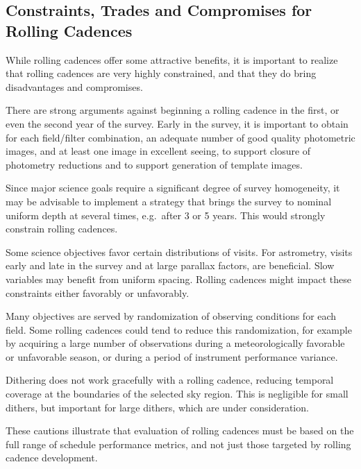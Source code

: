 
\subsection{Constraints, Trades and Compromises for Rolling Cadences}
\label{sec:rolling:trades}

While rolling cadences offer some attractive benefits, it is important
to realize that rolling cadences are very highly constrained, and that
they do bring disadvantages and compromises.

There are strong arguments against beginning a rolling cadence in the
first, or even the second year of the survey.  Early in the survey, it
is important to obtain for each field/filter combination, an adequate
number of good quality photometric images, and at least one image in
excellent seeing, to support closure of photometry reductions and to
support generation of template images.

Since major science goals require a significant degree of survey
homogeneity, it may be advisable to implement a strategy that brings the
survey to nominal uniform depth at several times, e.g.\ after 3 or 5
years.  This would strongly constrain rolling cadences.

Some science objectives favor certain distributions of visits.  For
astrometry, visits early and late in the survey and at large parallax
factors, are beneficial.  Slow variables may benefit from uniform
spacing.  Rolling cadences might impact these constraints either
favorably or unfavorably.

Many objectives are served by randomization of observing conditions for
each field.  Some rolling cadences could tend to reduce this
randomization, for example by acquiring a large number of observations
during a meteorologically favorable or unfavorable season, or during a
period of instrument performance variance.

Dithering does not work gracefully with a rolling cadence, reducing
temporal coverage at the boundaries of the selected sky region.  This is
negligible for small dithers, but important for large dithers, which are
under consideration.

These cautions illustrate that evaluation of rolling cadences must be
based on the full range of schedule performance metrics, and not just
those targeted by rolling cadence development.



